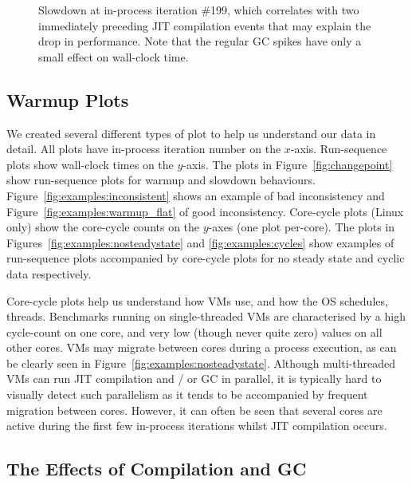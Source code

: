 \documentclass[acmsmall,screen]{acmart}
\begin{document}
\begin{figure}[!tbp]
\begin{minipage}[t]{0.485\textwidth}
\caption{Slowdown at in-process iteration \#199, which correlates
with two immediately preceding JIT compilation events
that may explain the drop in performance. Note that the
regular GC spikes have only a small effect on wall-clock time.}
\label{fig:examples:slowdown1}
\end{minipage}
\end{figure}


\subsection{Warmup Plots}

We created several different types of plot to help us understand our data in detail.
All plots have in-process iteration number on the
$x$-axis. Run-sequence plots show wall-clock times on the $y$-axis. The
plots in Figure~\ref{fig:changepoint} show run-sequence plots for warmup and
slowdown behaviours. Figure~\ref{fig:examples:inconsistent} shows an example of bad inconsistency and
Figure~\ref{fig:examples:warmup_flat} of good inconsistency. Core-cycle plots (Linux only) show the
core-cycle counts on the $y$-axes (one plot per-core). The plots in
Figures~\ref{fig:examples:nosteadystate} and \ref{fig:examples:cycles} show
examples of run-sequence plots accompanied by core-cycle plots for no steady
state and cyclic data respectively.

Core-cycle plots help us understand how VMs use, and how the OS schedules,
threads. Benchmarks running on single-threaded VMs are characterised by a high
cycle-count on one core, and very low (though never quite zero) values on all
other cores. VMs may migrate between cores during a process
execution, as can be clearly seen in Figure~\ref{fig:examples:nosteadystate}.
Although multi-threaded VMs can run JIT compilation and / or GC in parallel,
it is typically hard to visually detect such parallelism as it tends to be
accompanied by frequent migration between cores.
However, it can often be seen that several cores are active during the first few
in-process iterations whilst JIT compilation occurs.


\subsection{The Effects of Compilation and GC}
\label{sec:deepdive}
\end{document}
